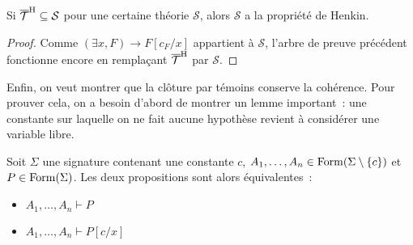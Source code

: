 \begin{property}\label{prop.henkin.ext}
  Si $\overline{\mathcal T}^{\mathrm H}\subseteq \mathcal S$ pour une certaine théorie
  $\mathcal S$, alors $\mathcal S$ a la propriété de Henkin.
\end{property}

\begin{proof}
  Comme $(\exists x,F)\to F[c_F/x]$ appartient à $\mathcal S$, l'arbre de preuve
  précédent fonctionne encore en remplaçant $\overline{\mathcal T}^{\mathrm H}$ par
  $\mathcal S$.
\end{proof}

Enfin, on veut montrer que la clôture par témoins conserve la cohérence. Pour
prouver cela, on a besoin d'abord de montrer un lemme important~: une constante
sur laquelle on ne fait aucune hypothèse revient à considérer une variable
libre.

\begin{lemma}\label{lem.var.const}
  Soit $\Sigma$ une signature contenant une constante $c$,
  $A_1,\ldots,A_n\in\operatorname{Form}(\Sigma\setminus\{c\})$ et $P\in\operatorname{Form}(\Sigma)$.
  Les deux propositions sont alors équivalentes~:
  \begin{itemize}
  \item $A_1,\ldots,A_n\vdash P$
  \item $A_1,\ldots,A_n\vdash P[c/x]$
  \end{itemize}
\end{lemma}

